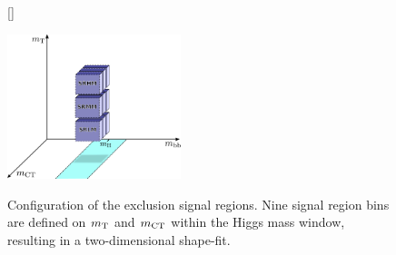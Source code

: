 \begin{figure}
[\FBwidth]
{\caption{Configuration of the exclusion signal regions. Nine signal region bins are defined on $m_{\textrm{T}}$ and $m_{\textrm{CT}}$ within the Higgs mass window, resulting in a two-dimensional shape-fit.}\label{fig:sr_strategy}}
{\includegraphics[width=0.45\textwidth]{strategy_2}}
\end{figure}


